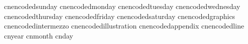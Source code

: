    cnencodedsunday           {}
   cnencodedmonday           {}
   cnencodedtuesday          {}
   cnencodedwednesday        {}
   cnencodedthursday         {}
   cnencodedfriday           {}
   cnencodedsaturday         {}
   cnencodedgraphics         {}
   cnencodedintermezzo       {}
   cnencodedillustration     {}
   cnencodedappendix         {}
   cnencodedline             {}
   cnyear                    {}
   cnmonth                   {}
   cnday                     {}
\stopencoding

